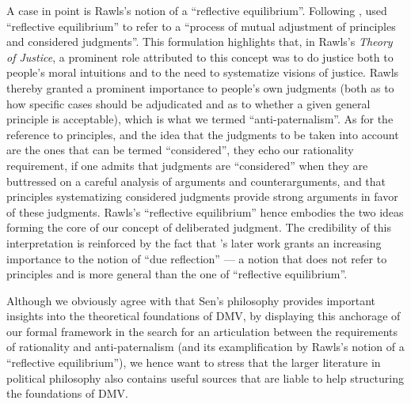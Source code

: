\documentclass[version=3.21, pagesize, twoside=off, bibliography=totoc, DIV=calc, fontsize=12pt, a4paper, french, english]{scrartcl}
\begin{document}
A case in point is Rawls’s notion of a “reflective equilibrium”. 
Following \citet{goodman_fact_1983}, \citet[][p.18]{rawls_theory_1999} used “reflective equilibrium” to refer to a “process of mutual adjustment of principles and considered judgments”. 
This formulation highlights that, in Rawls's \emph{Theory of Justice}, a prominent role attributed to this concept was to do justice both to people's moral intuitions and to the need to systematize visions of justice. 
Rawls thereby granted a prominent importance to people's own judgments (both as to how specific cases should be adjudicated and as to whether a given general principle is acceptable), which is what we termed  “anti-paternalism”. 
As for the reference to principles, and the idea that the judgments to be taken into account are the ones that can be termed “considered”, they echo our rationality requirement, if one admits that judgments are  “considered” when they are buttressed on a careful analysis of arguments and counterarguments, and that principles systematizing considered judgments provide strong arguments in favor of these judgments. 
Rawls's “reflective equilibrium” hence embodies the two ideas forming the core of our concept of deliberated judgment. 
The credibility of this interpretation is reinforced by the fact that \citeauthor{rawls_political_2005}’s \citeyearpar{rawls_political_2005} later work grants an increasing importance to the notion of “due reflection” --- a notion that does not refer to principles and is more general than the one of “reflective equilibrium”. 

 Although we obviously agree with \citeauthor{bartkowski_beyond_2018} that Sen's philosophy provides important insights into the theoretical foundations of DMV, by displaying this anchorage of our formal framework in the search for an articulation between the requirements of rationality and anti-paternalism (and its examplification by Rawls's notion of a “reflective equilibrium”), we hence want to stress that the larger literature in political philosophy also contains useful sources that are liable to help structuring the foundations of DMV.
\end{document}
